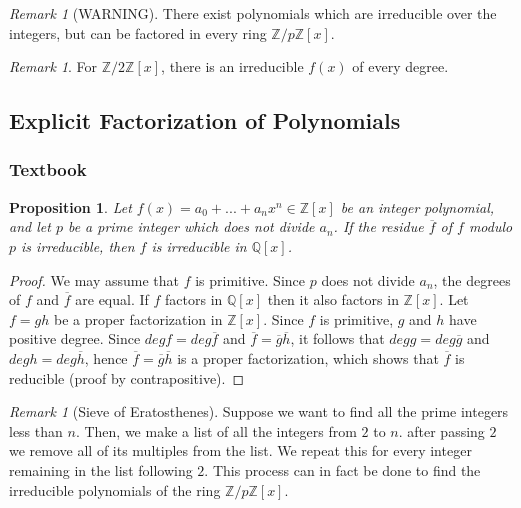\documentclass[12pt]{article}
\newtheorem{prop}[thm]{Proposition}
\theoremstyle{definition}
\theoremstyle{remark}
\newtheorem{rmk}[thm]{Remark}
\numberwithin{equation}{section}
\newcommand\Z{\mathbb Z}    %
\newcommand\Q{\mathbb Q}    %
\begin{document}
\vspace{15pt}

\begin{rmk}
        [WARNING] There exist polynomials which are irreducible over the integers, but can be factored in every ring $\Z/p\Z[x]$.
\end{rmk}

\vspace{15pt}


\begin{rmk}
        For $\Z/2\Z[x]$, there is an irreducible $f(x)$ of every degree.
\end{rmk}

\vspace{15pt}



\subsection{Explicit Factorization of Polynomials}

\subsubsection{Textbook}

\begin{prop}
        Let $f(x) = a_0+...+a_nx^n \in \Z[x]$ be an integer polynomial, and let $p$ be a prime integer which does not divide $a_n$. If the residue $\overline{f}$ of $f$ modulo $p$ is irreducible, then $f$ is irreducible in $\Q[x]$.
\end{prop}
\begin{proof}
        We may assume that $f$ is primitive. Since $p$ does not divide $a_n$, the degrees of $f$ and $\overline{f}$ are equal. If $f$ factors in $\Q[x]$ then it also factors in $\Z[x]$. Let $f = gh$ be a proper factorization in $\Z[x]$. Since $f$ is primitive, $g$ and $h$ have positive degree. Since $deg f = deg \overline{f}$ and $\overline{f} = \overline{g}\overline{h}$, it follows that $deg g = deg \overline{g}$ and $deg h = deg \overline{h}$, hence $\overline{f} = \overline{g}\overline{h}$ is a proper factorization, which shows that $\overline{f}$ is reducible (proof by contrapositive).
\end{proof}

\vspace{15pt}

\begin{rmk}[Sieve of Eratosthenes]
        Suppose we want to find all the prime integers less than $n$. Then, we make a list of all the integers from $2$ to $n$. after passing $2$ we remove all of its multiples from the list. We repeat this for every integer remaining in the list following $2$. This process can in fact be done to find the irreducible polynomials of the ring $\Z/p\Z[x]$.
\end{rmk}
\end{document}
